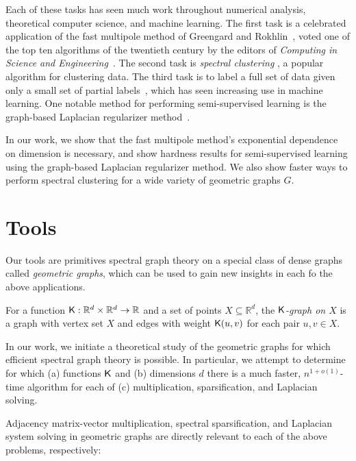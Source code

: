 \vspace{1mm}

Each of these tasks has seen much work throughout numerical analysis,
     theoretical computer science, and machine learning. The first task
     is a celebrated application of the fast multipole method of
     Greengard and Rokhlin~\cite{gr87, gr88, gr89}, voted one of the top
     ten algorithms of the twentieth century by the editors of
     \emph{Computing in Science and
       Engineering}~\cite{dongarra2000guest}.  The second task is
       \emph{spectral clustering} \cite{njw02, lwdh13}, a popular
       algorithm for clustering data. The third task is to label a full
       set of data given only a small set of partial
       labels~\cite{z05survey, csbz09, zl05}, which has seen increasing
       use in machine learning. One notable method for performing
       semi-supervised learning is the graph-based Laplacian regularizer
       method~\cite{lszlh19,zl05, bns06,z05}.

In our work, we show that the fast multipole method's exponential
dependence on dimension is necessary, and show hardness results for
semi-supervised learning using the graph-based Laplacian regularizer
method. We also show faster ways to perform spectral clustering for a
wide variety of geometric graphs $G$.
\section{Tools}
Our tools are primitives
spectral graph theory on a special class of dense graphs called
\emph{geometric graphs}, which can be used to gain new insights in each
fo the above applications. 

For a function $\mathsf{K}:\mathbb{R}^d\times
\mathbb{R}^d\rightarrow \mathbb{R}$ and a set of points $X\subseteq
\mathbb{R}^d$, the \emph{$\mathsf{K}$-graph on $X$} is a graph with vertex set
$X$ and edges with weight $\mathsf{K}(u,v)$ for each pair $u,v\in X$. 

In our work, we initiate a theoretical study of the geometric graphs
for which efficient spectral graph theory is possible. In particular, we
attempt to determine for which (a) functions $\mathsf{K}$ and (b) dimensions $d$
there is a much faster, $n^{1+o(1)}$-time algorithm for each of (c)
  multiplication, sparsification, and Laplacian solving. 

Adjacency
matrix-vector multiplication, spectral sparsification, and Laplacian
system solving in geometric graphs are directly relevant to each of the
above problems, respectively:

